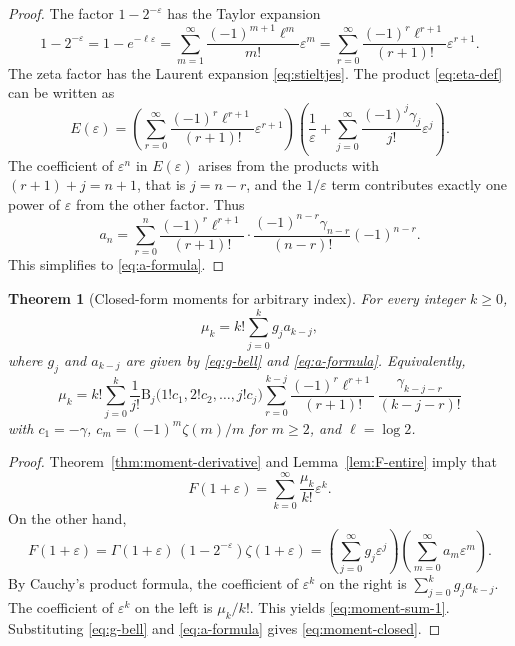 \documentclass[11pt]{amsart}
\numberwithin{equation}{section}
\newtheorem{theorem}{Theorem}[section]
\theoremstyle{definition}
\newcommand{\mom}[1]{\mu_{#1}}
\newcommand{\Bell}{\mathrm{B}}
\begin{document}
\begin{proof}
The factor $1-2^{-\varepsilon}$ has the Taylor expansion
\[
1-2^{-\varepsilon}
=1-e^{-\ell\varepsilon}
=\sum_{m=1}^{\infty}\frac{(-1)^{m+1}\ell^{m}}{m!}\varepsilon^{m}
=\sum_{r=0}^{\infty}\frac{(-1)^{r}\ell^{r+1}}{(r+1)!}\varepsilon^{r+1}.
\]
The zeta factor has the Laurent expansion \eqref{eq:stieltjes}. The product
\eqref{eq:eta-def} can be written as
\[
E(\varepsilon)
=\left(\sum_{r=0}^{\infty}\frac{(-1)^{r}\ell^{r+1}}{(r+1)!}\varepsilon^{r+1}\right)
\left(\frac{1}{\varepsilon}+\sum_{j=0}^{\infty}\frac{(-1)^{j}\gamma_{j}}{j!}\varepsilon^{j}\right).
\]
The coefficient of $\varepsilon^{n}$ in $E(\varepsilon)$ arises from the
products with $(r+1)+j=n+1$, that is $j=n-r$, and the $1/\varepsilon$ term
contributes exactly one power of $\varepsilon$ from the other factor. Thus
\[
a_{n}
=\sum_{r=0}^{n}\frac{(-1)^{r}\ell^{r+1}}{(r+1)!}\cdot
\frac{(-1)^{n-r}\gamma_{n-r}}{(n-r)!}(-1)^{n-r}.
\]
This simplifies to \eqref{eq:a-formula}.
\end{proof}

\begin{theorem}[Closed-form moments for arbitrary index]\label{thm:moments-closed}
For every integer $k\ge 0$,
\begin{equation}\label{eq:moment-sum-1}
\mom{k}
=k!\sum_{j=0}^{k}g_{j}a_{k-j},
\end{equation}
where $g_{j}$ and $a_{k-j}$ are given by \eqref{eq:g-bell} and
\eqref{eq:a-formula}. Equivalently,
\begin{equation}\label{eq:moment-closed}
\boxed{
\mom{k}
=
k!\sum_{j=0}^{k}
\frac{1}{j!}\Bell_{j}\bigl(1!c_{1},2!c_{2},\dots,j!c_{j}\bigr)
\sum_{r=0}^{k-j}
\frac{(-1)^{r}\ell^{r+1}}{(r+1)!}\,
\frac{\gamma_{k-j-r}}{(k-j-r)!}
}
\end{equation}
with $c_{1}=-\gamma$, $c_{m}=(-1)^{m}\zeta(m)/m$ for $m\ge 2$, and $\ell=\log 2$.
\end{theorem}

\begin{proof}
Theorem~\ref{thm:moment-derivative} and Lemma~\ref{lem:F-entire} imply that
\[
F(1+\varepsilon)
=\sum_{k=0}^{\infty}\frac{\mom{k}}{k!}\varepsilon^{k}.
\]
On the other hand,
\[
F(1+\varepsilon)
=\Gamma(1+\varepsilon)\,(1-2^{-\varepsilon})\zeta(1+\varepsilon)
=\left(\sum_{j=0}^{\infty}g_{j}\varepsilon^{j}\right)
\left(\sum_{m=0}^{\infty}a_{m}\varepsilon^{m}\right).
\]
By Cauchy's product formula, the coefficient of $\varepsilon^{k}$ on the right
is $\sum_{j=0}^{k}g_{j}a_{k-j}$. The coefficient of $\varepsilon^{k}$ on the
left is $\mom{k}/k!$. This yields \eqref{eq:moment-sum-1}. Substituting
\eqref{eq:g-bell} and \eqref{eq:a-formula} gives \eqref{eq:moment-closed}.
\end{proof}
\end{document}
